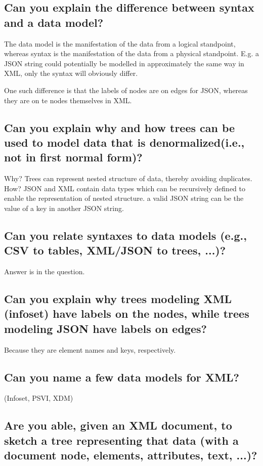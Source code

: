 \documentclass{article}
\begin{document}
\subsection{Can you explain the difference between syntax and a data model?}

The data model is the manifestation of the data from a logical standpoint, whereas syntax is the manifestation of the data from a physical standpoint. E.g. a JSON string could potentially be modelled in approximately the same way in XML, only the syntax will obviously differ.

One such difference is that the labels of nodes are on edges for JSON, whereas they are on te nodes themselves in XML.

\subsection{Can you explain why and how trees can be used to model data that is denormalized(i.e., not in first normal form)?}

Why? Trees can represent nested structure of data, thereby avoiding duplicates. How? JSON and XML contain data types which can be recursively defined to enable the representation of nested structure. a valid JSON string can be the value of a key in another JSON string.

\subsection{Can you relate syntaxes to data models (e.g., CSV to tables, XML/JSON to trees, ...)?}

Answer is in the question.

\subsection{Can you explain why trees modeling XML (infoset) have labels on the nodes, while trees modeling JSON have labels on edges?}

Because they are element names and keys, respectively.

\subsection{Can you name a few data models for XML?}

(Infoset, PSVI, XDM)

\subsection{Are you able, given an XML document, to sketch a tree representing that data (with a document node, elements, attributes, text, ...)?}
\end{document}
